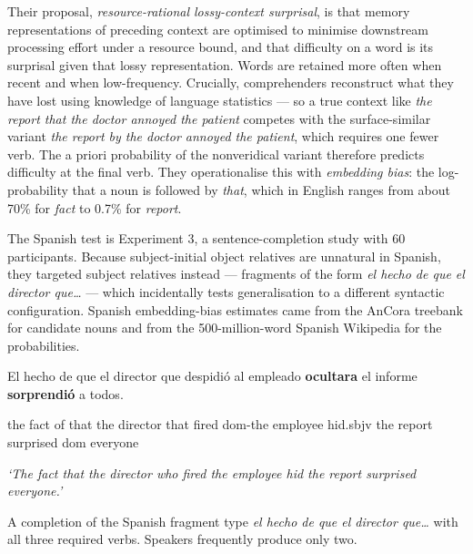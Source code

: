 \documentclass[11pt, a4paper]{article}
\newcommand{\gloss}[1]{%
  {\small\ttfamily\color{midgray}\RaggedRight #1\par}
}
\newcommand{\translation}[1]{%
  {\small\itshape\color{midgray}#1}\par
}
\begin{document}
Their proposal, \emph{resource-rational lossy-context surprisal}, is that memory representations of preceding context are optimised to minimise downstream processing effort under a resource bound, and that difficulty on a word is its surprisal given that lossy representation. Words are retained more often when recent and when low-frequency. Crucially, comprehenders reconstruct what they have lost using knowledge of language statistics --- so a true context like \emph{the report that the doctor annoyed the patient} competes with the surface-similar variant \emph{the report by the doctor annoyed the patient}, which requires one fewer verb. The a priori probability of the nonveridical variant therefore predicts difficulty at the final verb. They operationalise this with \emph{embedding bias}: the log-probability that a noun is followed by \emph{that}, which in English ranges from about 70\% for \emph{fact} to 0.7\% for \emph{report}.

The Spanish test is Experiment 3, a sentence-completion study with 60 participants. Because subject-initial object relatives are unnatural in Spanish, they targeted subject relatives instead --- fragments of the form \emph{el hecho de que el director que\ldots} --- which incidentally tests generalisation to a different syntactic configuration. Spanish embedding-bias estimates came from the AnCora treebank for candidate nouns and from the 500-million-word Spanish Wikipedia for the probabilities.

\begin{tcolorbox}[colback=panelgray, colframe=oxblood, boxrule=0pt, leftrule=2.6pt, arc=0pt, left=14pt, right=14pt, top=10pt, bottom=10pt, breakable]
\begin{xlist}
\item[(5)] \normalfont\normalsize\upshape\color{inkgray} El hecho de que el director que despidió al empleado \textbf{ocultara} el informe \textbf{sorprendió} a todos.\par
\gloss{the fact of that the director that fired dom-the employee hid.sbjv the report surprised dom everyone}
\translation{`The fact that the director who fired the employee hid the report surprised everyone.'}
\par{\footnotesize\ttfamily\color{oxblood}A completion of the Spanish fragment type \emph{el hecho de que el director que\ldots} with all three required verbs. Speakers frequently produce only two.}
\end{xlist}
\end{tcolorbox}
\end{document}
